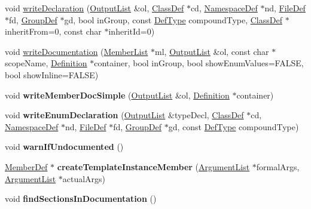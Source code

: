 \begin{DoxyCompactItemize}
\item 
void \hyperlink{class_member_def_ab829c9b186aecbe88b238e9dc353e3bb}{write\-Declaration} (\hyperlink{class_output_list}{Output\-List} \&ol, \hyperlink{class_class_def}{Class\-Def} $\ast$cd, \hyperlink{class_namespace_def}{Namespace\-Def} $\ast$nd, \hyperlink{class_file_def}{File\-Def} $\ast$fd, \hyperlink{class_group_def}{Group\-Def} $\ast$gd, bool in\-Group, const \hyperlink{class_definition_intf_a2dc566dfec40397b2990e6520536ecb5}{Def\-Type} compound\-Type, \hyperlink{class_class_def}{Class\-Def} $\ast$inherit\-From=0, const char $\ast$inherit\-Id=0)
\item 
void \hyperlink{class_member_def_abfc62bd6218ead893a878df26c1e3c12}{write\-Documentation} (\hyperlink{class_member_list}{Member\-List} $\ast$ml, \hyperlink{class_output_list}{Output\-List} \&ol, const char $\ast$scope\-Name, \hyperlink{class_definition}{Definition} $\ast$container, bool in\-Group, bool show\-Enum\-Values=F\-A\-L\-S\-E, bool show\-Inline=F\-A\-L\-S\-E)
\item 
\hypertarget{class_member_def_ab79ebce2ca5a57b470136cf2e8e950a1}{void {\bfseries write\-Member\-Doc\-Simple} (\hyperlink{class_output_list}{Output\-List} \&ol, \hyperlink{class_definition}{Definition} $\ast$container)}\label{class_member_def_ab79ebce2ca5a57b470136cf2e8e950a1}

\item 
\hypertarget{class_member_def_aeb585c0cbbb796f99b6ca61326ec059a}{void {\bfseries write\-Enum\-Declaration} (\hyperlink{class_output_list}{Output\-List} \&type\-Decl, \hyperlink{class_class_def}{Class\-Def} $\ast$cd, \hyperlink{class_namespace_def}{Namespace\-Def} $\ast$nd, \hyperlink{class_file_def}{File\-Def} $\ast$fd, \hyperlink{class_group_def}{Group\-Def} $\ast$gd, const \hyperlink{class_definition_intf_a2dc566dfec40397b2990e6520536ecb5}{Def\-Type} compound\-Type)}\label{class_member_def_aeb585c0cbbb796f99b6ca61326ec059a}

\item 
\hypertarget{class_member_def_a5ba4d6d8b1d7b571c2a7ff87b1e27ea1}{void {\bfseries warn\-If\-Undocumented} ()}\label{class_member_def_a5ba4d6d8b1d7b571c2a7ff87b1e27ea1}

\item 
\hypertarget{class_member_def_ad6819227b0e540b6c850a10684d548c8}{\hyperlink{class_member_def}{Member\-Def} $\ast$ {\bfseries create\-Template\-Instance\-Member} (\hyperlink{class_argument_list}{Argument\-List} $\ast$formal\-Args, \hyperlink{class_argument_list}{Argument\-List} $\ast$actual\-Args)}\label{class_member_def_ad6819227b0e540b6c850a10684d548c8}

\item 
\hypertarget{class_member_def_ad714b0e193e95efc23bb5de8dfb76cb6}{void {\bfseries find\-Sections\-In\-Documentation} ()}\label{class_member_def_ad714b0e193e95efc23bb5de8dfb76cb6}

\end{DoxyCompactItemize}

